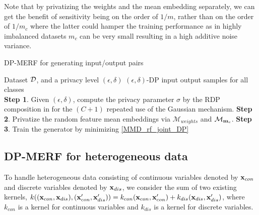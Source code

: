 \documentclass{article}
\begin{document}
Note that by privatizing the weights and the mean embedding separately, we can get the benefit of sensitivity being on the order of  $1/m$, rather than on the order of $1/m_c$ where the latter could hamper the training performance as in highly imbalanced datasets $m_c$ can be very small resulting in a high additive noise variance.






\begin{algorithm}[!t]
\caption{DP-MERF for generating input/output pairs}\label{algo:rf_ME_joint}
\begin{algorithmic}
\vspace{0.1cm}
\REQUIRE Dataset $\mathcal{D}$, and a privacy level $(\epsilon, \delta)$
\vspace{0.1cm}
\ENSURE $(\epsilon, \delta)$-DP input output samples for all classes\\
\STATE \textbf{Step 1}. Given $(\epsilon, \delta)$, compute the privacy parameter $\sigma$ by the RDP composition in \cite{pmlr-v89-wang19b} for the $(C+1)$ repeated use of the Gaussian mechanism. 
\STATE  \textbf{Step 2}. Privatize the random feature mean embeddings  via $\mathcal{M}_{weights}$ and $\mathcal{M}_{\mathbf{m}_c}$.
\STATE  \textbf{Step 3}. Train the generator by minimizing \eqref{MMD_rf_joint_DP}
\end{algorithmic}
\end{algorithm}




\subsection
{DP-MERF for heterogeneous data}\label{sec:Methods_hetero}

To handle heterogeneous data consisting of continuous variables denoted by $\mathbf{x}_{con}$ and discrete variables denoted by $\mathbf{x}_{dis}$, we consider the sum of two existing kernels, $k((\mathbf{x}_{con}, \mathbf{x}_{dis}), (\mathbf{x}'_{con}, \mathbf{x}'_{dis})) = k_{con}(\mathbf{x}_{con}, \mathbf{x}'_{con}) + k_{dis} (\mathbf{x}_{dis}, \mathbf{x}'_{dis})$, where $k_{con}$ is a kernel for continuous variables and $k_{dis}$ is a kernel for discrete variables.
\end{document}
